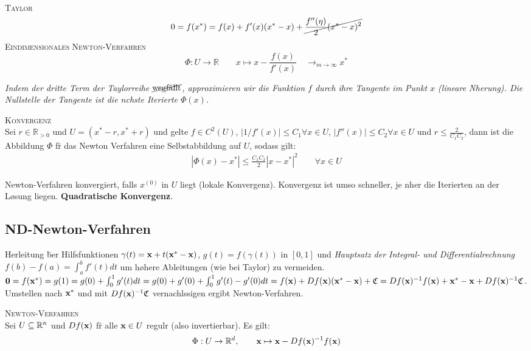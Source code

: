 \textsc{Taylor} \\
\begin{equation*}
0 = f(x^*) = f(x) + f'(x)(x^* - x) + \cancel{\frac{f''(\eta)}{2}(x^*-x)^2}
\end{equation*}
\textsc{Eindimensionales Newton-Verfahren}\\
\begin{equation*}
\Phi : U \rightarrow \mathbb{R} \qquad x \mapsto x- \frac{f(x)}{f'(x)} \quad  {\rightarrow}_{m \rightarrow \infty} x^*
\end{equation*}

\emph{Indem der dritte Term der Taylorreihe $\cancel{\text{wegf\"{a}llt}}$, approximieren wir die Funktion $f$ durch ihre Tangente im Punkt $x$ (lineare N\a herung). Die Nullstelle der Tangente ist die n\a chste Iterierte $\Phi(x)$.}\vspace{0.2cm}

\textsc{Konvergenz}\\
Sei $r\in \mathbb{R}_{>0}$ und $U=(x^*-r, x^*+r)$ und gelte $f\in C^2(U)$, $|1/f'(x)|\leq C_1 \forall x\in U$, $|f''(x)| \leq C_2 \forall x\in U$ und $r \leq \frac{2}{C_1C_2}$, dann ist die Abbildung $\Phi$ f\u r das Newton Verfahren eine Selbstabbildung auf $U$, sodass gilt:
\begin{align*}
|\Phi(x) - x^* | \leq \frac{C_1C_2}{2}|x-x^*|^2 \qquad \forall x\in U
\end{align*}

Newton-Verfahren konvergiert, falls $x^{(0)}$ in $U$ liegt (lokale Konvergenz). Konvergenz ist umso schneller, je n\a her die Iterierten an der L\o sung liegen. \textbf{Quadratische Konvergenz}.

\subsection{ND-Newton-Verfahren}
Herleitung \u ber Hilfsfunktionen $\gamma(t) = \mbox{\bf x}+t(\mbox{\bf x}^*-\mbox{\bf x})$, $g(t)=f(\gamma(t))$ in $[0,1]$ und \emph{Hauptsatz der Integral- und Differentialrechnung} $
f(b)-f(a) = \int_a^b f'(t) dt $ um h\o here Ableitungen (wie bei Taylor) zu vermeiden. $\mbox{\bf 0} = f(\mbox{\bf x}^*) = g(1) = g(0) + \int_0^1 g'(t) dt = g(0) + g'(0) + \int_0^1 g'(t)-g'(0)dt = f(\mbox{\bf x})+Df(\mbox{\bf x})(\mbox{\bf x}^*-\mbox{\bf x}) + \mathfrak{C} = Df(\mbox{\bf x})^{-1}f(\mbox{\bf x}) + \mbox{\bf x}^* - \mbox{\bf x} + Df(\mbox{\bf x})^{-1} \mathfrak{C}$. Umstellen nach $\mbox{\bf x}^*$ und mit $Df(\mbox{\bf x})^{-1} \mathfrak{C}$ vernachl\a ssigen ergibt Newton-Verfahren.\vspace{0.2cm}

\textsc{Newton-Verfahren}\\
Sei $U \subseteq \mathbb{R}^{n}$ und $Df(\mbox{\bf x})$ f\u r alle $\mbox{\bf x} \in U$ regul\a r (also invertierbar). Es gilt:
\begin{align*}
\Phi : U \rightarrow \mathbb{R}^{d}, \qquad \mbox{\bf x} \mapsto \mbox{\bf x} - Df(\mbox{\bf x})^{-1}f(\mbox{\bf x})
\end{align*}

